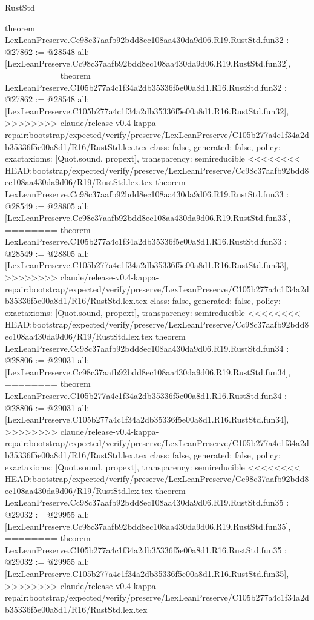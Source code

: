 \begin{lexlean}{RustStd}
\begin{coremodule}
{\begin{coremodule}
{{{{{{{{{{{{{{{{{{{{{{{{{{{{{{{{{{theorem LexLeanPreserve.Cc98c37aafb92bdd8ec108aa430da9d06.R19.RustStd.fun32 : @27862 := @28548 {
  all: [LexLeanPreserve.Cc98c37aafb92bdd8ec108aa430da9d06.R19.RustStd.fun32],
========
theorem LexLeanPreserve.C105b277a4c1f34a2db35336f5e00a8d1.R16.RustStd.fun32 : @27862 := @28548 {
  all: [LexLeanPreserve.C105b277a4c1f34a2db35336f5e00a8d1.R16.RustStd.fun32],
>>>>>>>> claude/release-v0.4-kappa-repair:bootstrap/expected/verify/preserve/LexLeanPreserve/C105b277a4c1f34a2db35336f5e00a8d1/R16/RustStd.lex.tex
  class: false,
  generated: false,
  policy: exact{axioms: [Quot.sound, propext]},
  transparency: semireducible
}
<<<<<<<< HEAD:bootstrap/expected/verify/preserve/LexLeanPreserve/Cc98c37aafb92bdd8ec108aa430da9d06/R19/RustStd.lex.tex
theorem LexLeanPreserve.Cc98c37aafb92bdd8ec108aa430da9d06.R19.RustStd.fun33 : @28549 := @28805 {
  all: [LexLeanPreserve.Cc98c37aafb92bdd8ec108aa430da9d06.R19.RustStd.fun33],
========
theorem LexLeanPreserve.C105b277a4c1f34a2db35336f5e00a8d1.R16.RustStd.fun33 : @28549 := @28805 {
  all: [LexLeanPreserve.C105b277a4c1f34a2db35336f5e00a8d1.R16.RustStd.fun33],
>>>>>>>> claude/release-v0.4-kappa-repair:bootstrap/expected/verify/preserve/LexLeanPreserve/C105b277a4c1f34a2db35336f5e00a8d1/R16/RustStd.lex.tex
  class: false,
  generated: false,
  policy: exact{axioms: [Quot.sound, propext]},
  transparency: semireducible
}
<<<<<<<< HEAD:bootstrap/expected/verify/preserve/LexLeanPreserve/Cc98c37aafb92bdd8ec108aa430da9d06/R19/RustStd.lex.tex
theorem LexLeanPreserve.Cc98c37aafb92bdd8ec108aa430da9d06.R19.RustStd.fun34 : @28806 := @29031 {
  all: [LexLeanPreserve.Cc98c37aafb92bdd8ec108aa430da9d06.R19.RustStd.fun34],
========
theorem LexLeanPreserve.C105b277a4c1f34a2db35336f5e00a8d1.R16.RustStd.fun34 : @28806 := @29031 {
  all: [LexLeanPreserve.C105b277a4c1f34a2db35336f5e00a8d1.R16.RustStd.fun34],
>>>>>>>> claude/release-v0.4-kappa-repair:bootstrap/expected/verify/preserve/LexLeanPreserve/C105b277a4c1f34a2db35336f5e00a8d1/R16/RustStd.lex.tex
  class: false,
  generated: false,
  policy: exact{axioms: [Quot.sound, propext]},
  transparency: semireducible
}
<<<<<<<< HEAD:bootstrap/expected/verify/preserve/LexLeanPreserve/Cc98c37aafb92bdd8ec108aa430da9d06/R19/RustStd.lex.tex
theorem LexLeanPreserve.Cc98c37aafb92bdd8ec108aa430da9d06.R19.RustStd.fun35 : @29032 := @29955 {
  all: [LexLeanPreserve.Cc98c37aafb92bdd8ec108aa430da9d06.R19.RustStd.fun35],
========
theorem LexLeanPreserve.C105b277a4c1f34a2db35336f5e00a8d1.R16.RustStd.fun35 : @29032 := @29955 {
  all: [LexLeanPreserve.C105b277a4c1f34a2db35336f5e00a8d1.R16.RustStd.fun35],
>>>>>>>> claude/release-v0.4-kappa-repair:bootstrap/expected/verify/preserve/LexLeanPreserve/C105b277a4c1f34a2db35336f5e00a8d1/R16/RustStd.lex.tex
}}}}}}}}}}}}}}}}}}}}}}}}}}}}}}}}}}}}}}}
\end{coremodule}}
\end{coremodule}
\end{lexlean}
